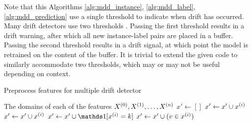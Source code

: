 Note that this Algorithms \ref{alg:mdd_instance}, \ref{alg:mdd_label}, \ref{alg:mdd_prediction} use a single threshold to indicate when drift has occurred. Many drift detectors use two thresholds \cite{DDM}\cite{EDDM}\cite{HDDM}. Passing the first threshold results in a drift warning, after which all new instance-label pairs are placed in a buffer. Passing the second threshold results in a drift signal, at which point the model is retrained on the content of the buffer. It is trivial to extend the given code to similarly accommodate two thresholds, which may or may not be useful depending on context. 

\begin{algorithm}
    \caption{Preprocess features for multiple drift detector}
    \label{alg:mdd_preprocess}
    \begin{algorithmic}
        \Require The domains of each of the features $X^{(0)},X^{(1)},\dots,X^{(n)}$
        \State $x' \gets []$
            \State $x' \gets x' \cup x^{(i)}$
            \State $x' \gets x' \cup x^{(i)}$
              \State $x' \gets x' \cup \id{\x{i}=k}$
            \EndFor
              \State $x' \gets x' \cup (v\in x^{(i)})$
            \EndFor
          \EndIf
        \EndFor
      \EndFunction
    \end{algorithmic}
\end{algorithm}

